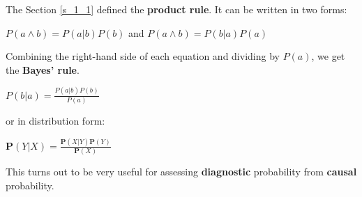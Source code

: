 The Section \ref{s_1_1} defined the \textbf{product rule}. It can be written in two forms:
\begin{center}
    $P(a \wedge b) = P(a|b)P(b)$ and $P(a \wedge b) = P(b|a)P(a)$
\end{center}
Combining the right-hand side of each equation and dividing by $P(a)$, we get the \textbf{Bayes' rule}.
\begin{definition}[title={Bayes' theorem}]
    \begin{center}
        $P(b|a) = \frac{P(a|b)P(b)}{P(a)}$ 
    \end{center} \vspace{3.5pt}
    or in distribution form:
    \begin{center}
        $\mathbf{P}(Y|X) = \frac{\mathbf{P}(X|Y)\mathbf{P}(Y)}{\mathbf{P}(X)}$ 
    \end{center}
\end{definition}
This turns out to be very useful for assessing \textbf{diagnostic} probability from \textbf{causal} probability.